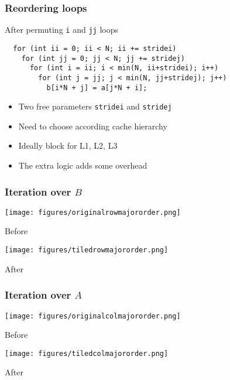 \documentclass[dvipsnames,presentation,aspectratio=169,14pt]{beamer}
\begin{document}
\begin{frame}[fragile]
  \frametitle{Reordering loops}
  \begin{exampleblock}{\small After permuting \texttt{i} and \texttt{jj} loops}
\begin{verbatim}
  for (int ii = 0; ii < N; ii += stridei)
    for (int jj = 0; jj < N; jj += stridej)
      for (int i = ii; i < min(N, ii+stridei); i++)
        for (int j = jj; j < min(N, jj+stridej); j++)
          b[i*N + j] = a[j*N + i];
\end{verbatim}
  \end{exampleblock}
  \begin{itemize}
  \item Two free parameters \texttt{stridei} and \texttt{stridej}
  \item Need to choose according cache hierarchy
  \item Ideally block for L1, L2, L3
  \item The extra logic adds some overhead
  \end{itemize}
\end{frame}

\begin{frame}
  \frametitle{Iteration over $B$}
  \begin{center}
    \begin{minipage}[t][\parskip][t]{0.4\textwidth}
      \texttt{[image: figures/originalrowmajororder.png]}
      \centering

      Before
    \end{minipage}
    \qquad
    \begin{minipage}[t][\parskip][t]{0.4\textwidth}
      \texttt{[image: figures/tiledrowmajororder.png]}
      \centering

      After
    \end{minipage}
  \end{center}
\end{frame}

\begin{frame}
  \frametitle{Iteration over $A$}
  \begin{center}
    \begin{minipage}[t][\parskip][t]{0.4\textwidth}
      \texttt{[image: figures/originalcolmajororder.png]}
      \centering

      Before
    \end{minipage}
    \qquad
    \begin{minipage}[t][\parskip][t]{0.4\textwidth}
      \texttt{[image: figures/tiledcolmajororder.png]}
      \centering

      After
    \end{minipage}
  \end{center}
\end{frame}
\end{document}
